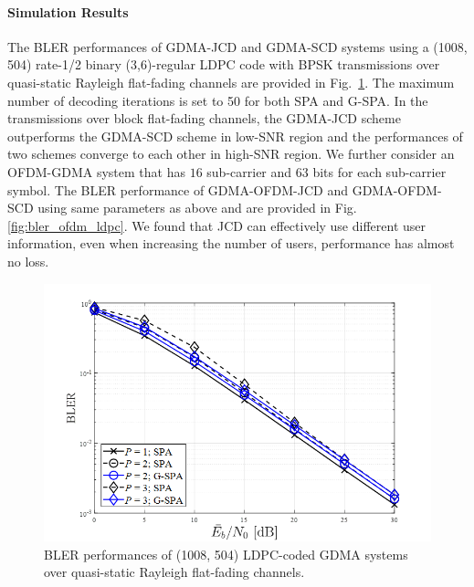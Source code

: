 \paragraph{Simulation Results} 

The BLER performances of GDMA-JCD and GDMA-SCD systems using a (1008, 504) rate-1/2 binary (3,6)-regular LDPC code with BPSK transmissions over quasi-static Rayleigh flat-fading channels are provided in Fig.~\ref{fig:bler_ldpc}. The maximum number of decoding iterations is set to 50 for both SPA and G-SPA. In the transmissions over block flat-fading channels, the GDMA-JCD scheme outperforms the GDMA-SCD scheme in low-SNR region and the performances of two schemes converge to each other in high-SNR region. We further consider an OFDM-GDMA system that has $16$ sub-carrier and $63$ bits for each sub-carrier symbol. The BLER performance of GDMA-OFDM-JCD and GDMA-OFDM-SCD using same parameters as above and are provided in Fig.~ \ref{fig:bler_ofdm_ldpc}. We found that JCD can effectively use different user information, even when increasing the number of users, performance has almost no loss.


\begin{figure}[t!]
 \centering
 \includegraphics[width=14cm]{fig/bler_ldpc.png}
 \caption{BLER performances of (1008, 504) LDPC-coded GDMA systems over quasi-static Rayleigh flat-fading channels.}
 \label{fig:bler_ldpc}
\end{figure}

